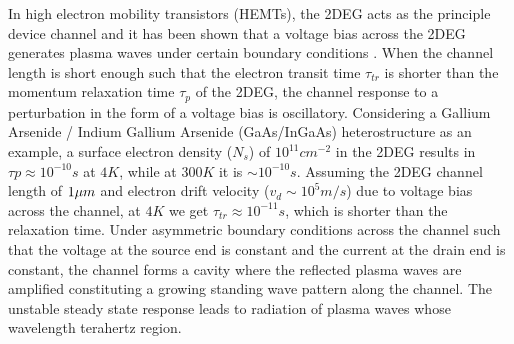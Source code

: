 \documentclass[11pt]{article}
\begin{document}
In high electron mobility transistors (HEMTs), the 2DEG acts as the principle device channel and it has been shown that a voltage bias across the 2DEG generates plasma waves under certain boundary conditions \cite{Dyakonov_1993}. When the channel length is short enough such that the electron transit time $\tau_{tr}$ is shorter than the momentum relaxation time $\tau_{p}$ of the 2DEG, the channel response to a perturbation in the form of a voltage bias is  oscillatory. Considering a Gallium Arsenide / Indium Gallium Arsenide (GaAs/InGaAs) heterostructure as an example, a surface electron density ($N_s$) of $10^{11} cm^{-2}$ in the 2DEG results in $\tau{p} \approx 10^{-10} s$ at $4 K$, while at $300 K$ it is $\sim 10^{-10} s$. Assuming the 2DEG channel length of $1 \mu m$ and electron drift velocity ($v_d \sim 10^5 m/s$) due to voltage bias across the channel, at $4 K$ we get $\tau_{tr} \approx 10^{-11} s$, which is shorter than the relaxation time. Under asymmetric boundary conditions across the channel such that the voltage at the source end is constant and the current at the drain end is constant, the channel forms a cavity where the reflected plasma waves are amplified constituting a growing standing wave pattern along the channel. The unstable steady state response leads to radiation of plasma waves whose wavelength terahertz region.






\clearpage %


\end{document}
